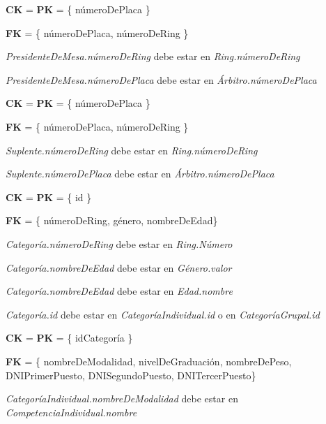 
\textbf{CK} = \textbf{PK} = \{ númeroDePlaca \}
 
\textbf{FK} = \{ númeroDePlaca, númeroDeRing \}
 
\textit{PresidenteDeMesa.númeroDeRing} debe estar en \textit{Ring.númeroDeRing}

\textit{PresidenteDeMesa.númeroDePlaca} debe estar en \textit{Árbitro.númeroDePlaca}\\


\textbf{CK} = \textbf{PK} = \{ númeroDePlaca \}
 
\textbf{FK} = \{ númeroDePlaca, númeroDeRing \}
 
\textit{Suplente.númeroDeRing} debe estar en \textit{Ring.númeroDeRing}

\textit{Suplente.númeroDePlaca} debe estar en \textit{Árbitro.númeroDePlaca}\\


\textbf{CK} = \textbf{PK} = \{ id \}

\textbf{FK} = \{ númeroDeRing, género, nombreDeEdad\}

\textit{Categoría.númeroDeRing} debe estar en \textit{Ring.N\'umero}

\textit{Categoría.nombreDeEdad} debe estar en \textit{Género.valor}

\textit{Categoría.nombreDeEdad} debe estar en \textit{Edad.nombre}

\textit{Categor\'ia.id} debe estar en \textit{Categor\'iaIndividual.id} o en \textit{Categor\'iaGrupal.id}\\


\textbf{CK} = \textbf{PK} = \{ idCategor\'ia \}

\textbf{FK} = \{ nombreDeModalidad, nivelDeGraduación, nombreDePeso, DNIPrimerPuesto, DNISegundoPuesto, DNITercerPuesto\}

\textit{CategoríaIndividual.nombreDeModalidad} debe estar en \textit{CompetenciaIndividual.nombre}

